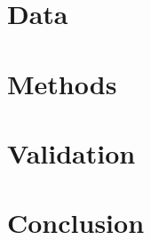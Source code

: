 \documentclass[preprint2,trackchanges]{aastex}
\newcommand{\project}[1]{\textsl{#1}}
\newcommand{\logg}{\log g}
\newcommand{\teff}{T_{\mathrm{eff}}}
\newcommand{\Nstars}{483,330}
\begin{document}
\section{Data}
\label{sec:data}


\section{Methods}
\label{sec:methods}



\section{Validation}
\label{sec:validation}





\section{Conclusion}
\label{sec:conclusion}

\end{document}
